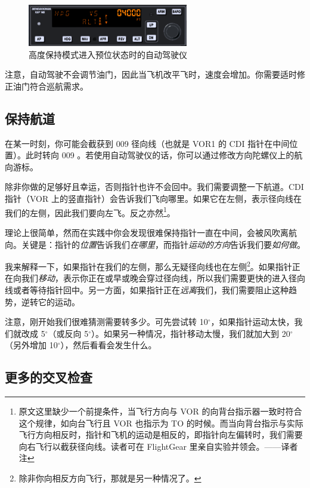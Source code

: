 \begin{figure}
  \begin{center}
    \includegraphics[width=7cm]{img/ap_alt}
    \caption{高度保持模式进入预位状态时的自动驾驶仪}
    \label{fig:ap_alt}
  \end{center}
\end{figure}

注意，自动驾驶不会调节油门，因此当飞机改平飞时，速度会增加。你需要适时修正油门符合巡航需求。

\subsection{保持航道}

在某一时刻，你可能会截获到 009 径向线（也就是 VOR1 的 CDI 指针在中间位置）。此时转向 009 。若使用自动驾驶仪的话，你可以通过修改方向陀螺仪上的航向游标。

除非你做的足够好且幸运，否则指针也许不会回中。我们需要调整一下航道。CDI 指针（VOR 上的竖直指针）会告诉我们飞向哪里。如果它在左侧，表示径向线在我们的左侧，因此我们要向左飞。反之亦然\footnote{原文这里缺少一个前提条件，当飞行方向与 VOR 的向背台指示器一致时符合这个规律，如向台飞行且 VOR 也指示为 TO 的时候。而当向背台指示与实际飞行方向相反时，指针和飞机的运动是相反的，即指针向左偏转时，我们需要向右飞行以截获径向线。读者可在 FlightGear 里亲自实验并领会。——译者注}。

理论上很简单，然而在实践中你会发现很难保持指针一直在中间，会被风吹离航向。关键是：指针的\emph{位置}告诉我们\emph{在哪里}，而指针\emph{运动的方向}告诉我们要\emph{如何做}。

我来解释一下，如果指针在我们的左侧，那么无疑径向线也在左侧\footnote{除非你向相反方向飞行，那就是另一种情况了。}。如果指针正在向我们\emph{移动}，表示你正在或早或晚会穿过径向线，所以我们需要更快的进入径向线或者等待指针回中。另一方面，如果指针正在\emph{远离}我们，我们需要阻止这种趋势，逆转它的运动。

注意，刚开始我们很难猜测需要转多少。可先尝试转 10$^\circ$，如果指针运动太快，我们就改成 5$^\circ$（或反向 5$^\circ$）。如果另一种情况，指针移动太慢，我们就加大到 20$^\circ$（另外增加 10$^\circ$），然后看看会发生什么。

\subsection{更多的交叉检查}

